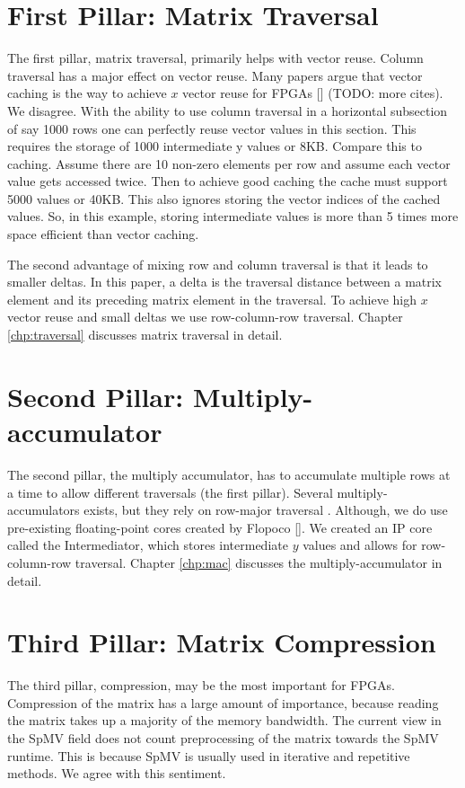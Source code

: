 \section{First Pillar: Matrix Traversal}
\par The first pillar, matrix traversal, primarily helps with vector reuse. Column traversal has a major effect on vector reuse. Many papers argue that vector caching is the way to achieve $x$ vector reuse for FPGAs [\cite{prelim:umuroglu, prelim:nagar1}] (TODO: more cites). We disagree. With the ability to use column traversal in a horizontal subsection of say 1000 rows one can perfectly reuse vector values in this section. This requires the storage of 1000 intermediate y values or 8KB. Compare this to caching. Assume there are 10 non-zero elements per row and assume each vector value gets accessed twice. Then to achieve good caching the cache must support 5000 values or 40KB. This also ignores storing the vector indices of the cached values. So, in this example, storing intermediate values is more than 5 times more space efficient than vector caching.
\par The second advantage of mixing row and column traversal is that it leads to smaller deltas. In this paper, a delta is the traversal distance between a matrix element and its preceding matrix element in the traversal. To achieve high $x$ vector reuse and small deltas we use row-column-row traversal. Chapter \ref{chp:traversal} discusses matrix traversal in detail.

\section{Second Pillar: Multiply-accumulator}

\par The second pillar, the multiply accumulator, has to accumulate multiple rows at a time to allow different traversals (the first pillar). Several multiply-accumulators exists, but they rely on row-major traversal \cite{}. Although, we do use pre-existing floating-point cores created by Flopoco [\cite{}]. We created an IP core called the Intermediator, which stores intermediate $y$ values and allows for row-column-row traversal. Chapter \ref{chp:mac} discusses the multiply-accumulator in detail.

\section{Third Pillar: Matrix Compression}
\par The third pillar, compression, may be the most important for FPGAs. Compression of the matrix has a large amount of importance, because reading the matrix takes up a majority of the memory bandwidth. The current view in the SpMV field does not count preprocessing of the matrix towards the SpMV runtime. This is because SpMV is usually used in iterative and repetitive methods. We agree with this sentiment.
